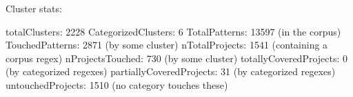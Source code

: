 Cluster stats:

totalClusters: 2228
CategorizedClusters: 6
TotalPatterns: 13597 (in the corpus)
TouchedPatterns: 2871 (by some cluster)
nTotalProjects: 1541 (containing a corpus regex)
nProjectsTouched: 730 (by some cluster)
totallyCoveredProjects: 0 (by categorized regexes)
partiallyCoveredProjects: 31 (by categorized regexes)
untouchedProjects: 1510 (no category touches these)

